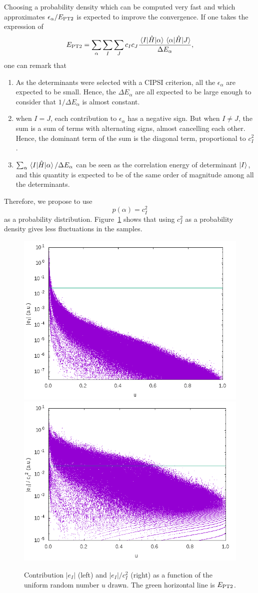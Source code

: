 \documentclass[./thesis.tex]{subfiles}
\begin{document}
Choosing a probability density which can be computed very fast and which
approximates $\epsilon_\alpha / E_\text{PT2}$ is expected to improve the convergence.
If one takes the expression of 
\begin{equation}
E_\text{PT2} = \sum_\alpha \sum_I \sum_J c_I c_J \frac{\mel{I}{\hat{H}}{\alpha} \mel{\alpha}{\hat{H}}{J}}{\Delta E_\alpha}, 
\end{equation}
one can remark that
\begin{enumerate}
\item As the determinants were selected with a CIPSI criterion, all the $\epsilon_\alpha$ are expected to be small. Hence, the $\Delta E_\alpha$ are all expected to be large enough to consider that $1/\Delta E_\alpha$ is almost constant.
\item 
when $I=J$, each contribution to $\epsilon_\alpha$ has a negative sign. But when $I \ne J$, the sum is a sum of terms with alternating signs, almost cancelling each other. Hence, the dominant term of the sum is the diagonal term, proportional to $c_I^2$.
\item $\sum_\alpha \mel{I}{\hat{H}}{\alpha} / \Delta E_\alpha$ can be seen as the correlation
energy of determinant ${\ket{I}}$, and this quantity is expected to be of the same order of magnitude among all the determinants.
\end{enumerate}
Therefore, we propose to use 
\begin{equation}
p(\alpha) = {c_I^2}
\end{equation}
as a probability distribution. 
Figure~\ref{fig:ei} shows that using $c_I^2$ as a probability density gives less
fluctuations in the samples.
\begin{figure}[h]
	\begin{center}
		\includegraphics[width=0.49\columnwidth]{figures/pt2/eI}
		\includegraphics[width=0.49\columnwidth]{figures/pt2/eici2}
	\end{center}
		\caption{Contribution $|e_I|$ (left) and $|e_I|/c_I^2$ (right) as a function of the uniform random number $u$ drawn. The green horizontal line is $E_\text{PT2}$.}
		\label{fig:ei}
\end{figure}
\end{document}
